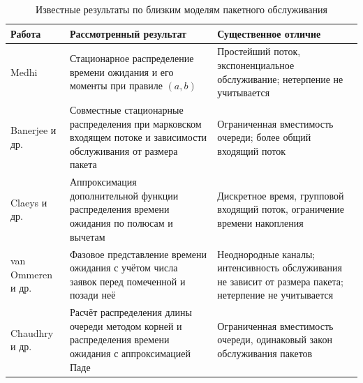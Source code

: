 \begin{table}[htbp]
\centering\small
\caption{Известные результаты по близким моделям пакетного обслуживания}\label{tab:prior}
\begin{tabular}{p{.22\linewidth}p{.36\linewidth}p{.34\linewidth}}
\hline
Работа & Рассмотренный результат & Существенное отличие \\\hline
Medhi~\cite{medhi1975} & Стационарное распределение времени ожидания и его моменты при правиле $(a,b)$ & Простейший поток, экспоненциальное обслуживание; нетерпение не учитывается \\
Banerjee и др.~\cite{banerjee2015} & Совместные стационарные распределения при марковском входящем потоке и зависимости обслуживания от размера пакета & Ограниченная вместимость очереди; более общий входящий поток \\
Claeys и др.~\cite{claeys2013} & Аппроксимация дополнительной функции распределения времени ожидания по полюсам и вычетам & Дискретное время, групповой входящий поток, ограничение времени накопления \\
van Ommeren и др.~\cite{vanommer2020} & Фазовое представление времени ожидания с учётом числа заявок перед помеченной и позади неё & Неоднородные каналы; интенсивность обслуживания не зависит от размера пакета; нетерпение не учитывается \\
Chaudhry и др.~\cite{chaudhry2023} & Расчёт распределения длины очереди методом корней и распределения времени ожидания с аппроксимацией Паде & Ограниченная вместимость очереди, одинаковый закон обслуживания пакетов \\
\hline
\end{tabular}
\end{table}

